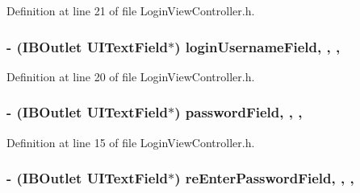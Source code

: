 Definition at line 21 of file Login\+View\+Controller.\+h.

\hypertarget{interface_login_view_controller_ae49ed05525b5bf7917464914ebb4739e}{}
\subsubsection[{login\+Username\+Field}]{\setlength{\rightskip}{0pt plus 5cm}-\/ (I\+B\+Outlet U\+I\+Text\+Field$\ast$) login\+Username\+Field\hspace{0.3cm}{\ttfamily [read]}, {\ttfamily [write]}, {\ttfamily [nonatomic]}, {\ttfamily [weak]}}\label{interface_login_view_controller_ae49ed05525b5bf7917464914ebb4739e}


Definition at line 20 of file Login\+View\+Controller.\+h.

\hypertarget{interface_login_view_controller_a7069e68973d8dc49728a8ada392482cf}{}
\subsubsection[{password\+Field}]{\setlength{\rightskip}{0pt plus 5cm}-\/ (I\+B\+Outlet U\+I\+Text\+Field$\ast$) password\+Field\hspace{0.3cm}{\ttfamily [read]}, {\ttfamily [write]}, {\ttfamily [nonatomic]}, {\ttfamily [weak]}}\label{interface_login_view_controller_a7069e68973d8dc49728a8ada392482cf}


Definition at line 15 of file Login\+View\+Controller.\+h.

\hypertarget{interface_login_view_controller_ac608bcfc4e744536f424e521e4b2e17d}{}
\subsubsection[{re\+Enter\+Password\+Field}]{\setlength{\rightskip}{0pt plus 5cm}-\/ (I\+B\+Outlet U\+I\+Text\+Field$\ast$) re\+Enter\+Password\+Field\hspace{0.3cm}{\ttfamily [read]}, {\ttfamily [write]}, {\ttfamily [nonatomic]}, {\ttfamily [weak]}}\label{interface_login_view_controller_ac608bcfc4e744536f424e521e4b2e17d}


